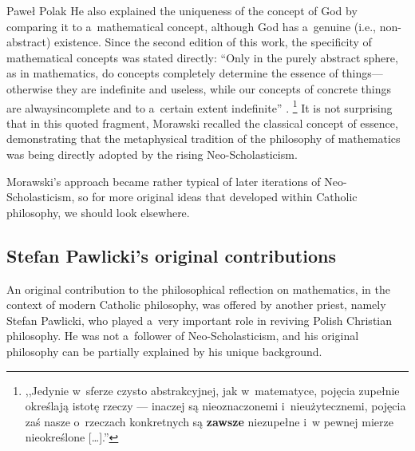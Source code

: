 \begin{artengenv}{Paweł Polak}
He also explained the uniqueness of the concept of God by comparing it to a~mathematical concept, although God has a~genuine (i.e., non-abstract) existence. Since the second edition of this work, the specificity of mathematical concepts was stated directly: ``Only in the purely abstract sphere, as in mathematics, do concepts completely determine the essence of things---otherwise they are indefinite and useless, while our concepts of concrete things are alwaysincomplete and to a~certain extent indefinite''
\parencite[][pp.213–214]{morawski_celowosc_1891}.%
\footnote{,,Jedynie w~sferze czysto abstrakcyjnej, jak w~matematyce, pojęcia zupełnie określają istotę rzeczy --- inaczej są nieoznaczonemi i~nieużytecznemi, pojęcia zaś nasze o~rzeczach konkretnych są \textbf{zawsze} niezupełne i~w pewnej mierze nieokreślone [\ldots].''} It is not surprising that in this quoted fragment, Morawski recalled the classical concept of essence, demonstrating that the metaphysical tradition of the philosophy of mathematics was being directly adopted by the rising Neo-Scholasticism.

Morawski's approach became rather typical of later iterations of Neo-Scholasticism, so for more original ideas that developed within Catholic philosophy, we should look elsewhere.

\subsection{Stefan Pawlicki's original contributions}

An original contribution to the philosophical reflection on mathematics, in the context of modern Catholic philosophy, was offered by another priest, namely Stefan Pawlicki, who played a~very important role in reviving Polish Christian philosophy. He was not a~follower of Neo-Scholasticism, and his original philosophy can be partially explained by his unique background.


\end{artengenv}
